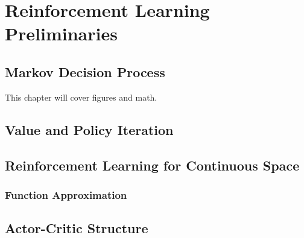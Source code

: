 \chapter{Reinforcement Learning Preliminaries}

\section{Markov Decision Process}
This chapter will cover figures and math. 

\section{Value and Policy Iteration}

\section{Reinforcement Learning for Continuous Space}
\subsection{Function Approximation}


\section{Actor-Critic Structure}
